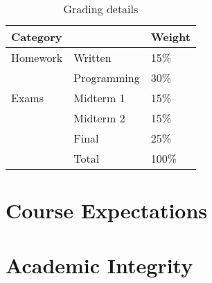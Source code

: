 \documentclass[11pt]{article}
\begin{document}
\begin{table}[htb]
  \centering
\begin{tabular}{lll}
\toprule
Category &  & Weight\\
\midrule
Homework & Written & 15\%\\
 & Programming & 30\%\\
Exams & Midterm 1 & 15\%\\
 & Midterm 2 & 15\%\\
 & Final & 25\%\\
\midrule
 & Total & 100\%\\
\bottomrule
\end{tabular}
  \caption{Grading details}
  \label{tab:grading}
\end{table}
\begin{comment}
  #+ORGTBL: SEND grades orgtbl-to-latex :splice nil :skip 0 :booktabs t
  | Category |             | Weight |
  |----------+-------------+--------|
  | Homework | Written     |    15%
  |          | Programming |    30%
  | Exams    | Midterm 1   |    15%
  |          | Midterm 2   |    15%
  |          | Final       |    25%
  |----------+-------------+--------|
  |          | Total       |   100%
  #+TBLFM: @7$3=100*vsum(@I..II);%
\end{comment}

\section{Course Expectations}



\section{Academic Integrity}



\printbibliography{}\label{sec:references}
\end{document}
